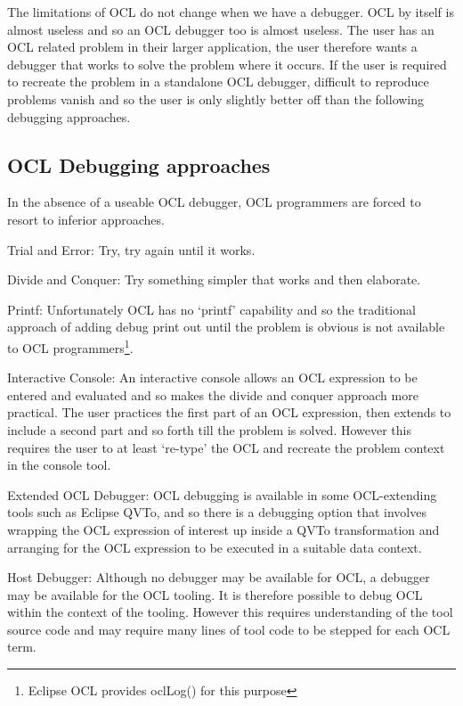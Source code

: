 \documentclass[a4paper]{article}
\begin{document}

The limitations of OCL do not change when we have a debugger. OCL by itself is almost useless and so an OCL debugger too is almost useless. The user has an OCL related problem in their larger application, the user therefore wants a debugger that works to solve the problem where it occurs. If the user is required to recreate the problem in a standalone OCL debugger, difficult to reproduce problems vanish and so the user is only slightly better off than the following debugging approaches.

\subsection{OCL Debugging approaches}

In the absence of a useable OCL debugger, OCL programmers are forced to resort to inferior approaches.

Trial and Error: Try, try again until it works.

Divide and Conquer: Try something simpler that works and then elaborate.

Printf: Unfortunately OCL has no `printf' capability and so the traditional approach of adding debug print out until the problem is obvious is not available to OCL programmers\footnote{Eclipse OCL provides oclLog() for this purpose}.

Interactive Console: An interactive console allows an OCL expression to be entered and evaluated and so makes the divide and conquer approach more practical. The user practices the first part of an OCL expression, then extends to include a second part and so forth till the problem is solved. However this requires the user to at least `re-type' the OCL and recreate the problem context in the console tool.

Extended OCL Debugger: OCL debugging is available in some OCL-extending tools such as Eclipse QVTo, and so there is a debugging option that involves wrapping the OCL expression of interest up inside a QVTo transformation and arranging for the OCL expression to be executed in a suitable data context.

Host Debugger: Although no debugger may be available for OCL, a debugger may be available for the OCL tooling. It is therefore possible to debug OCL within the context of the tooling. However this requires understanding of the tool source code and may require many lines of tool code to be stepped for each OCL term.
\end{document}
